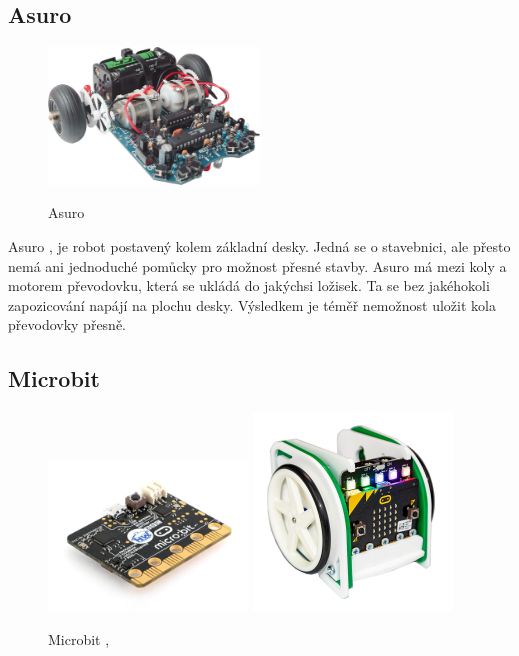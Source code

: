 \documentclass{template/socthesis}
\begin{document}
\newpage

\subsection{Asuro}
\begin{figure}[h]	
	\centering
	\includegraphics[width=0.5\textwidth]{img/asuro.png}
	\caption{Asuro} 
	\cite{Asuro_obr}	
\end{figure}
Asuro \cite{Asuro_navod}, \cite{Asuro_cena} je robot postavený kolem základní desky. Jedná se o stavebnici, ale přesto nemá ani jednoduché pomůcky pro možnost přesné stavby. Asuro má mezi koly a motorem převodovku, která se ukládá do jakýchsi ložisek. Ta se bez jakéhokoli zapozicování napájí na plochu desky. Výsledkem je téměř nemožnost uložit kola převodovky přesně.

\newpage

\subsection{Microbit}

\begin{figure}[h]
		
		\centering
		\includegraphics[width=150pt]{img/microbit0.jpg}
		\includegraphics[width=150pt]{img/microbit1.jpg}
		\caption{Microbit \cite{Microbit_obr1}, \cite{Microbit_obr2}} 
		
\end{figure}
\end{document}

